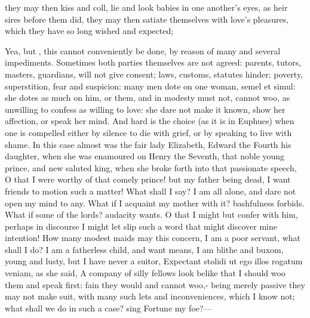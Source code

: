 {they may then kiss and coll, lie and look babies in one another's eyes,
as heir sires before them did, they may then satiate themselves with
love's pleasures, which they have so long wished and expected;

Yea, but , this cannot conveniently be done, by
reason of many and several impediments. Sometimes both parties
themselves are not agreed: parents, tutors, masters, guardians, will
not give consent; laws, customs, statutes hinder: poverty,
superstition, fear and suspicion: many men dote on one woman, semel et
simul: she dotes as much on him, or them, and in modesty must not,
cannot woo, as unwilling to confess as willing to love: she dare not
make it known, show her affection, or speak her mind. And hard is the
choice (as it is in Euphues) when one is compelled either by silence to
die with grief, or by speaking to live with shame. In this case almost
was the fair lady Elizabeth, Edward the Fourth his daughter, when she
was enamoured on Henry the Seventh, that noble young prince, and new
saluted king, when she broke forth into that passionate speech, 
O that I were worthy of that comely prince! but my father being dead, I
want friends to motion such a matter! What shall I say? I am all alone,
and dare not open my mind to any. What if I acquaint my mother with it?
bashfulness forbids. What if some of the lords? audacity wants. O that
I might but confer with him, perhaps in discourse I might let slip such
a word that might discover mine intention! How many modest maids may
this concern, I am a poor servant, what shall I do? I am a fatherless
child, and want means, I am blithe and buxom, young and lusty, but I
have never a suitor, Expectant stolidi ut ego illos rogatum veniam, as
she said, A company of silly fellows look belike that I should
woo them and speak first: fain they would and cannot woo,- being merely passive they may not make suit, with
many such lets and inconveniences, which I know not; what shall we do
in such a case? sing Fortune my foe?---

}
